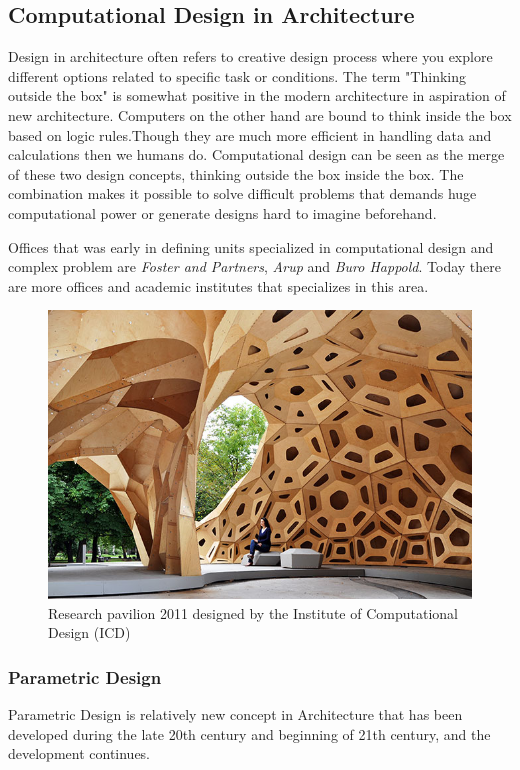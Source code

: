 \subsection{Computational Design in Architecture}

Design in architecture often refers to creative design process where you explore different options related to specific task or conditions. The term "Thinking outside the box" is somewhat positive in the modern architecture in aspiration of new architecture. Computers on the other hand are bound to think inside the box based on logic rules.Though they are much more efficient in handling data and calculations then we humans do. Computational design can be seen as the merge of these two design concepts, thinking outside the box inside the box. The combination makes it possible to solve difficult problems that demands huge computational power or generate designs hard to imagine beforehand. 

Offices  that was early in defining units specialized in computational design and complex problem are \textit{Foster and Partners},\textit{ Arup} and \textit{Buro Happold}. Today there are more offices and academic institutes that specializes in this area.

\begin{figure}[H]
\centering
\includegraphics[width=0.9\linewidth ]{figure/Introduction/ICD.jpg}
\caption{Research pavilion 2011 designed by the Institute of Computational Design (ICD) }
\end{figure}

\subsubsection{Parametric Design}
Parametric Design is relatively new concept in Architecture that has been developed during the late 20th century and beginning of 21th century, and the development continues. 


